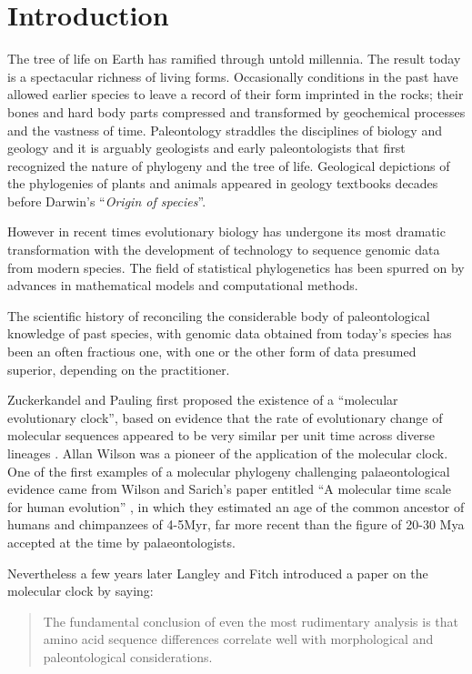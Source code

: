 \section{Introduction} 

The tree of life on Earth has ramified through untold millennia. The result today is a spectacular richness of living forms. Occasionally conditions in the past have allowed earlier species to leave a record of their form imprinted in the rocks; their bones and hard body parts compressed and transformed by geochemical processes and the vastness of time. Paleontology straddles the disciplines of biology and geology and it is arguably geologists and early paleontologists that first recognized the nature of phylogeny and the tree of life. Geological depictions of the phylogenies of plants and animals appeared in geology textbooks decades before Darwin's ``{\em Origin of species}''.

However in recent times evolutionary biology has undergone its most dramatic transformation with the development of technology to sequence genomic data from modern species. The field of statistical phylogenetics has been spurred on by advances in mathematical models and computational methods.

The scientific history of reconciling the considerable body of paleontological knowledge of past species, with genomic data obtained from today's species has been an often fractious one, with one or the other form of data presumed superior, depending on the practitioner.

Zuckerkandel and Pauling first proposed the existence of a ``molecular evolutionary clock'', based on evidence that the rate of evolutionary change of molecular sequences appeared to be very similar per unit time across diverse lineages \cite{zuckerkandl1965}. Allan Wilson was a pioneer of the application of the molecular clock. One of the first examples of a molecular phylogeny challenging palaeontological evidence came from Wilson and Sarich's paper entitled ``A molecular time scale for human evolution'' \cite{WilsonSarich1969}, in which they estimated an age of the common ancestor of humans and chimpanzees of 4-5Myr, far more recent than the figure of 20-30 Mya accepted at the time by palaeontologists.

Nevertheless a few years later Langley and Fitch \cite{LangleyFitch1974} introduced a paper on the molecular clock by saying:

\begin{quotation}
The fundamental conclusion of even the most rudimentary analysis is that amino acid sequence differences correlate well with morphological and paleontological considerations.
\end{quotation}

